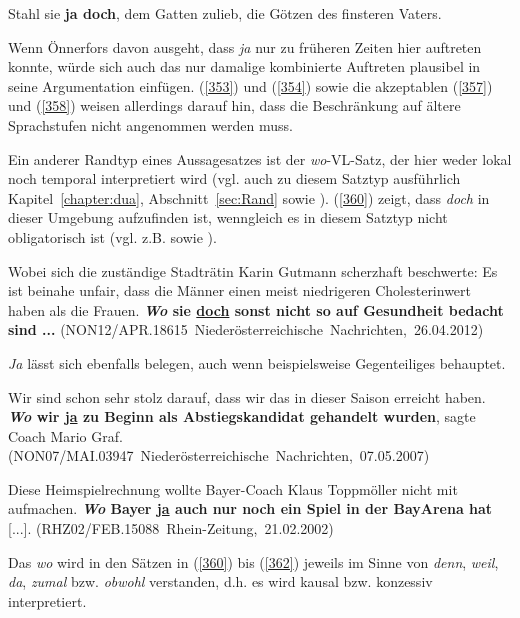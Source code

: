\begin{exe}
	\ex\label{359} 
	Stahl sie \textbf{ja doch}, dem Gatten zulieb, die Götzen des finsteren Vaters.	   
	\newline
	\hbox{}\hfill\hbox{\citet[187, Anm. 26]{Oppenrieder1987}}	
\end{exe}		
Wenn Önnerfors davon ausgeht, dass \textit{ja }nur zu früheren Zeiten hier auftreten konnte, würde sich auch das nur damalige kombinierte Auftreten plausibel in seine Argumentation einfügen. (\ref{353}) und (\ref{354}) sowie die akzeptablen (\ref{357}) und (\ref{358}) weisen allerdings darauf hin, dass die Beschränkung auf ältere Sprachstufen nicht angenommen werden muss. 

Ein anderer Randtyp eines Aussagesatzes ist  der \textit{wo}-VL-Satz, der hier weder lokal noch temporal interpretiert wird (vgl. auch zu diesem Satztyp ausführlich Kapitel~\ref{chapter:dua}, Abschnitt~\ref{sec:Rand} sowie \citealt{MuellerimDruck}). (\ref{360}) zeigt, dass \textit{doch} in dieser Umgebung aufzufinden ist, wenngleich es in diesem Satztyp nicht obligatorisch ist (vgl. z.B. \citealt[152]{Pasch1999} sowie \citealt[324]{Guenthner2002}).

\begin{exe}
	\ex\label{360} 
	\scriptsize
	Wobei sich die zuständige Stadträtin Karin Gutmann scherzhaft beschwerte: \glqq Es ist beinahe unfair, dass die Männer einen meist niedrigeren 				Cholesterinwert haben als die Frauen. \textbf{\textit{Wo} sie \underline{doch} sonst nicht so auf Gesundheit bedacht sind ...}\grqq{}    
	\newline
	\hbox{}\hfill\hbox{(NON12/APR.18615 Niederösterreichische Nachrichten, 26.04.2012)}	
\end{exe} 	
\textit{Ja} lässt sich ebenfalls belegen, auch wenn beispielsweise \citet[194]{Kwon2005} Gegenteiliges behauptet.

\begin{exe}
	\ex\label{361} 
	\scriptsize
	\glqq Wir sind schon sehr stolz darauf, dass wir das in dieser Saison erreicht haben. \textbf{\textit{Wo} wir \underline{ja} zu Beginn als Abstiegskandidat gehandelt wurden}\grqq{}, sagte Coach Mario Graf.    
	\newline
	\hbox{}\hfill\hbox{(NON07/MAI.03947 Niederösterreichische Nachrichten, 07.05.2007)}	
\end{exe}

\begin{exe}
	\ex\label{362} 
	\scriptsize
	Diese Heimspielrechnung wollte Bayer-Coach Klaus Toppmöller nicht mit aufmachen. \textbf{\textit{Wo} Bayer \underline{ja} auch nur noch ein Spiel in 		der BayArena hat} [...].   
	\hfill\hbox{(RHZ02/FEB.15088 Rhein-Zeitung, 21.02.2002)}	
\end{exe}
Das \textit{wo} wird in den Sätzen in (\ref{360}) bis (\ref{362}) jeweils im Sinne von \textit{denn}, \textit{weil}, \textit{da}, \textit{zumal} bzw. \textit{obwohl} verstanden, d.h. es wird kausal bzw. konzessiv interpretiert.

